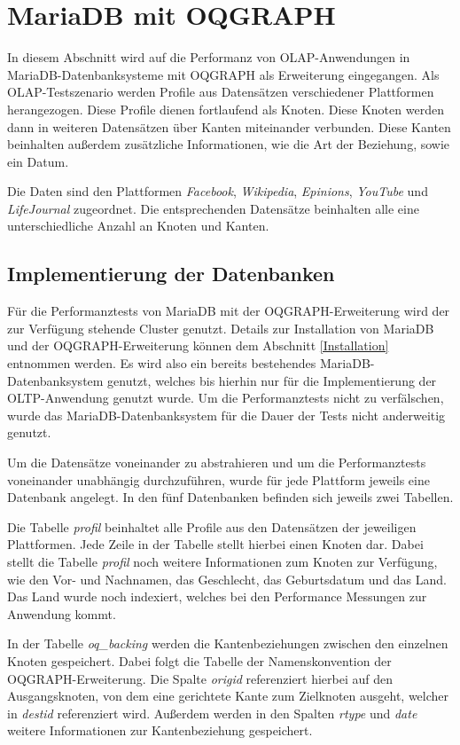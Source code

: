 \section{MariaDB mit OQGRAPH}%
In diesem Abschnitt wird auf die Performanz von OLAP-Anwendungen in MariaDB-Datenbanksysteme mit OQGRAPH als Erweiterung eingegangen. Als OLAP-Testszenario werden Profile aus Datensätzen verschiedener Plattformen herangezogen. Diese Profile dienen fortlaufend als Knoten. Diese Knoten werden dann in weiteren Datensätzen über Kanten miteinander verbunden. Diese Kanten beinhalten außerdem zusätzliche Informationen, wie die Art der Beziehung, sowie ein Datum.

Die Daten sind den Plattformen \emph{Facebook}, \emph{Wikipedia}, \emph{Epinions}, \emph{YouTube} und \emph{LifeJournal} zugeordnet. Die entsprechenden Datensätze beinhalten alle eine unterschiedliche Anzahl an Knoten und Kanten.

\subsection{Implementierung der Datenbanken}

Für die Performanztests von MariaDB mit der OQGRAPH-Erweiterung wird der zur Verfügung stehende Cluster genutzt. Details zur Installation von MariaDB und der OQGRAPH-Erweiterung können dem Abschnitt \ref{Installation} entnommen werden. Es wird also ein bereits bestehendes MariaDB-Datenbanksystem genutzt, welches bis hierhin nur für die Implementierung der OLTP-Anwendung genutzt wurde. Um die Performanztests nicht zu verfälschen, wurde das MariaDB-Datenbanksystem für die Dauer der Tests nicht anderweitig genutzt.

Um die Datensätze voneinander zu abstrahieren und um die Performanztests voneinander unabhängig durchzuführen, wurde für jede Plattform jeweils eine Datenbank angelegt. In den fünf Datenbanken befinden sich jeweils zwei Tabellen.

Die Tabelle \emph{profil} beinhaltet alle Profile aus den Datensätzen der jeweiligen Plattformen. Jede Zeile in der Tabelle stellt hierbei einen Knoten dar. Dabei stellt die Tabelle \emph{profil} noch weitere Informationen zum Knoten zur Verfügung, wie den Vor- und Nachnamen, das Geschlecht, das Geburtsdatum und das Land. Das Land wurde noch indexiert, welches bei den Performance Messungen zur Anwendung kommt.

In der Tabelle \emph{oq\_backing} werden die Kantenbeziehungen zwischen den einzelnen Knoten gespeichert. Dabei folgt die Tabelle der Namenskonvention der OQGRAPH-Erweiterung. Die Spalte \emph{origid} referenziert hierbei auf den Ausgangsknoten, von dem eine gerichtete Kante zum Zielknoten ausgeht, welcher in \emph{destid} referenziert wird. Außerdem werden in den Spalten \emph{rtype} und \emph{date} weitere Informationen zur Kantenbeziehung gespeichert.

